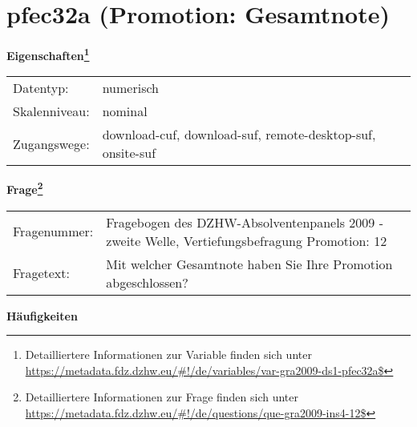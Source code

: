 
    \setcounter{footnote}{0}

    \vspace*{-1.8cm}
	\section{pfec32a (Promotion: Gesamtnote)}
	\label{section:pfec32a}



    \vspace*{0.5cm}
    \noindent\textbf{Eigenschaften\footnote{Detailliertere Informationen zur Variable finden sich unter
		\url{https://metadata.fdz.dzhw.eu/\#!/de/variables/var-gra2009-ds1-pfec32a$}}}\\
	\begin{tabularx}{\hsize}{@{}lX}
	Datentyp: & numerisch \\
	Skalenniveau: & nominal \\
	Zugangswege: &
	  download-cuf, 
	  download-suf, 
	  remote-desktop-suf, 
	  onsite-suf
 \\
    \end{tabularx}



				\vspace*{0.5cm}
                \noindent\textbf{Frage\footnote{Detailliertere Informationen zur Frage finden sich unter
		              \url{https://metadata.fdz.dzhw.eu/\#!/de/questions/que-gra2009-ins4-12$}}}\\
				\begin{tabularx}{\hsize}{@{}lX}
					Fragenummer: &
					  Fragebogen des DZHW-Absolventenpanels 2009 - zweite Welle, Vertiefungsbefragung Promotion:
					  12
 \\
					Fragetext: & Mit welcher Gesamtnote haben Sie Ihre Promotion abgeschlossen? \\
				\end{tabularx}





        		\vspace*{0.5cm}
                \noindent\textbf{Häufigkeiten}

